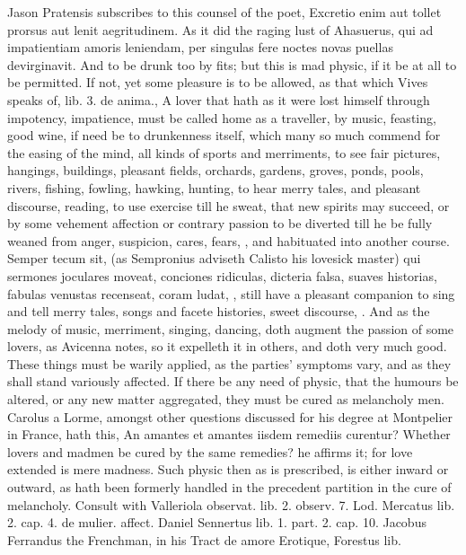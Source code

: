 Jason Pratensis subscribes to this counsel of the poet, Excretio
enim aut tollet prorsus aut lenit aegritudinem. As it did the raging
lust of Ahasuerus, qui ad impatientiam amoris leniendam, per
singulas fere noctes novas puellas devirginavit. And to be drunk too by
fits; but this is mad physic, if it be at all to be permitted. If not,
yet some pleasure is to be allowed, as that which Vives speaks of, lib.
3. de anima., A lover that hath as it were lost himself through
impotency, impatience, must be called home as a traveller, by music,
feasting, good wine, if need be to drunkenness itself, which many so
much commend for the easing of the mind, all kinds of sports and
merriments, to see fair pictures, hangings, buildings, pleasant fields,
orchards, gardens, groves, ponds, pools, rivers, fishing, fowling,
hawking, hunting, to hear merry tales, and pleasant discourse, reading,
to use exercise till he sweat, that new spirits may succeed, or by some
vehement affection or contrary passion to be diverted till he be fully
weaned from anger, suspicion, cares, fears, \etc{}, and habituated into
another course. Semper tecum sit, (as Sempronius adviseth Calisto
his lovesick master) qui sermones joculares moveat, conciones
ridiculas, dicteria falsa, suaves historias, fabulas venustas
recenseat, coram ludat, \etc{}, still have a pleasant companion to sing
and tell merry tales, songs and facete histories, sweet discourse, \etc{}.
And as the melody of music, merriment, singing, dancing, doth augment
the passion of some lovers, as  Avicenna notes, so it expelleth
it in others, and doth very much good. These things must be warily
applied, as the parties' symptoms vary, and as they shall stand
variously affected.
If there be any need of physic, that the humours be altered, or any new
matter aggregated, they must be cured as melancholy men. Carolus a
Lorme, amongst other questions discussed for his degree at Montpelier
in France, hath this, An amantes et amantes iisdem remediis curentur?
Whether lovers and madmen be cured by the same remedies? he affirms it;
for love extended is mere madness. Such physic then as is prescribed,
is either inward or outward, as hath been formerly handled in the
precedent partition in the cure of melancholy. Consult with Valleriola
observat. lib. 2. observ. 7. Lod. Mercatus lib. 2. cap. 4. de mulier.
affect. Daniel Sennertus lib. 1. part. 2. cap. 10. Jacobus
Ferrandus the Frenchman, in his \textlatin{Tract de amore Erotique}, Forestus lib.
